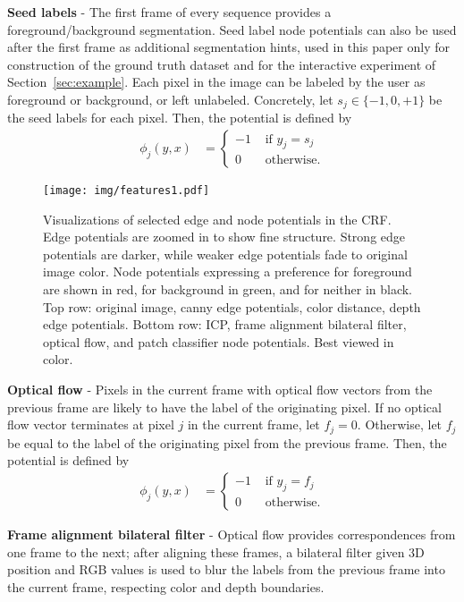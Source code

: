 \documentclass[journal]{IEEEtran}
\begin{document}
\textbf{Seed labels} - The first frame of every sequence provides a foreground/background segmentation.  Seed label node potentials can also be used after the first frame as additional segmentation hints, used in this paper only for construction of the ground truth dataset and for the interactive experiment of Section~\ref{sec:example}.  Each pixel in the image can be labeled by the user as foreground or background, or left unlabeled.  Concretely, let $s_j \in \{-1,0,+1\}$ be the seed labels for each pixel.  Then, the potential is defined by
\begin{align*}
  \phi_j(y, x) & =
  \left\{
  \begin{array}{rl}
    -1 & \mbox{ if } y_j = s_j \\
    0 & \mbox{ otherwise.}
  \end{array}
  \right.
\end{align*}

\begin{figure*}
  \centering
  \texttt{[image: img/features1.pdf]}
  \caption{Visualizations of selected edge and node potentials in the CRF.  Edge potentials are zoomed in to show fine structure.  Strong edge potentials are darker, while weaker edge potentials fade to original image color.  Node potentials expressing a preference for foreground are shown in red, for background in green, and for neither in black.  Top row: original image, canny edge potentials, color distance, depth edge potentials.  Bottom row: ICP, frame alignment bilateral filter, optical flow, and patch classifier node potentials.  Best viewed in color.}
  \label{fig:features}
\end{figure*}


\textbf{Optical flow} - Pixels in the current frame with optical flow vectors from the previous frame are likely to have the label of the originating pixel.  If no optical flow vector terminates at pixel $j$ in the current frame, let $f_j = 0$.  Otherwise, let $f_j$ be equal to the label of the originating pixel from the previous frame.  Then, the potential is defined by
\begin{align*}
  \phi_j(y, x) & =
  \left\{
  \begin{array}{rl}
    -1 & \mbox{ if } y_j = f_j \\
    0 & \mbox{ otherwise.}
  \end{array}
  \right.
\end{align*}

\textbf{Frame alignment bilateral filter} - Optical flow provides correspondences from one frame to the next; after aligning these frames, a bilateral filter given 3D position and RGB values is used to blur the labels from the previous frame into the current frame, respecting color and depth boundaries.
\end{document}
